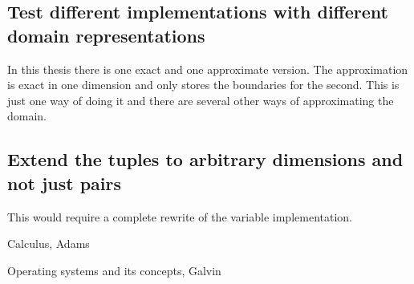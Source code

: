 \documentclass[a4paper,11pt]{article}
\begin{document}
\subsection{Test different implementations with different domain representations}
In this thesis there is one exact and one approximate version. The approximation is exact in one dimension and only stores the boundaries for the second. This is just one way of doing it and there are several other ways of approximating the domain.

\subsection{Extend the tuples to arbitrary dimensions and not just pairs}
This would require a complete rewrite of the variable implementation.

\begin{thebibliography}{99}
	Calculus, 
	Adams
	
	Operating systems and its concepts,
	Galvin
\end{thebibliography}
\end{document}
